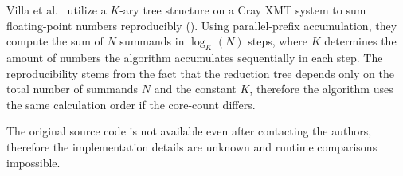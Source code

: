 Villa et al.~\cite{villa_effects_2009} utilize a $K$-ary tree structure on a Cray XMT system to sum floating-point numbers reproducibly ().
Using parallel-prefix accumulation, they compute the sum of $N$ summands in $\log_K (N)$ steps, where $K$ determines the amount of numbers the algorithm accumulates sequentially in each step.
The reproducibility stems from the fact that the reduction tree depends only on the total number of summands $N$ and the constant $K$, therefore the algorithm uses the same calculation order if the core-count differs.

The original source code is not available even after contacting the authors, therefore the implementation details are unknown and runtime comparisons impossible.
